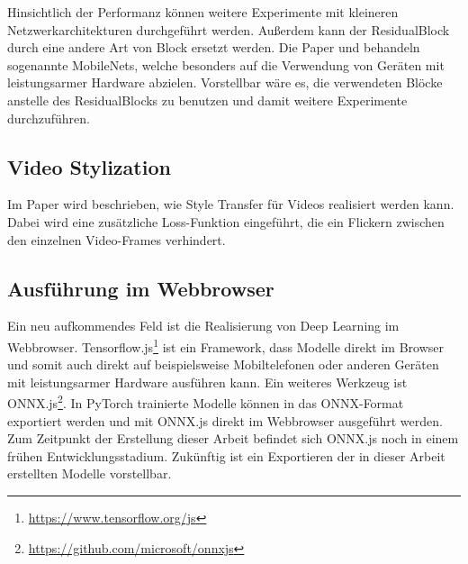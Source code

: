 Hinsichtlich der Performanz können weitere Experimente mit kleineren Netzwerkarchitekturen durchgeführt werden. Außerdem kann der ResidualBlock durch eine andere Art von Block ersetzt werden. Die Paper \cite{DBLP:journals/corr/HowardZCKWWAA17} und \cite{DBLP:journals/corr/abs-1801-04381} behandeln sogenannte MobileNets, welche besonders auf die Verwendung von Geräten mit leistungsarmer Hardware abzielen. Vorstellbar wäre es, die verwendeten Blöcke anstelle des ResidualBlocks zu benutzen und damit weitere Experimente durchzuführen.

\subsection{Video Stylization}
\label{sec:video_stylization}

Im Paper \cite{DBLP:journals/corr/abs-1807-01197} wird beschrieben, wie Style Transfer für Videos realisiert werden kann. Dabei wird eine zusätzliche Loss-Funktion eingeführt, die ein Flickern zwischen den einzelnen Video-Frames verhindert.

\subsection{Ausführung im Webbrowser}
\label{sec:inference_in_browser}

Ein neu aufkommendes Feld ist die Realisierung von Deep Learning im Webbrowser. Tensorflow.js\footnote{\url{https://www.tensorflow.org/js}} ist ein Framework, dass Modelle direkt im Browser und somit auch direkt auf beispielsweise Mobiltelefonen oder anderen Geräten mit leistungsarmer Hardware ausführen kann. Ein weiteres Werkzeug ist ONNX.js\footnote{\url{https://github.com/microsoft/onnxjs}}. In PyTorch trainierte Modelle können in das ONNX-Format exportiert werden und mit ONNX.js direkt im Webbrowser ausgeführt werden. Zum Zeitpunkt der Erstellung dieser Arbeit befindet sich ONNX.js noch in einem frühen Entwicklungsstadium. Zukünftig ist ein Exportieren der in dieser Arbeit erstellten Modelle vorstellbar.